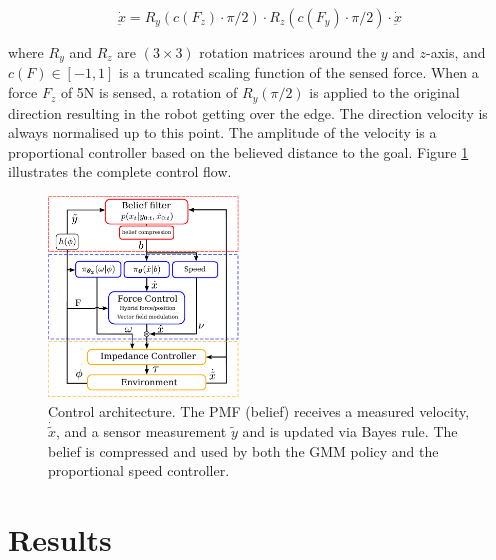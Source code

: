 \documentclass[final,5p,times,twocolumn]{elsarticle}
\begin{document}
\begin{equation}
  \dot{\underbar{x}} = R_y(c(F_z) \cdot \pi/2) \cdot R_z(c(F_y) \cdot \pi/2) \cdot \dot{\underbar{x}} \label{eq:modulation}
\end{equation}

where $R_y$ and $R_z$ are $(3 \times 3)$ rotation matrices around the $y$ and $z$-axis, and $c(F) \in [-1,1]$ is a truncated scaling function of the sensed 
force.  When a force $F_z$ of 5N is sensed, a rotation of $R_y(\pi/2)$ is applied to the original direction resulting in the robot
getting over the edge. The direction velocity is always normalised up to this point. The amplitude of the velocity is a proportional
controller based on the believed distance to the goal. Figure \ref{fig:control_flow} illustrates the complete control flow.

\begin{figure}
  \centering
  \includegraphics[width=0.45\textwidth]{./Figures/control_flow_final.pdf}
  \caption{Control architecture. The PMF (belief) receives a measured velocity, $\dot{\tilde{x}}$, and 
  a sensor measurement $\tilde{y}$ and is updated via Bayes rule. The belief is compressed and used by 
  both the GMM policy and the proportional speed controller.}
  \label{fig:control_flow}
\end{figure}

\section{Results}\label{sec:results}
\end{document}
